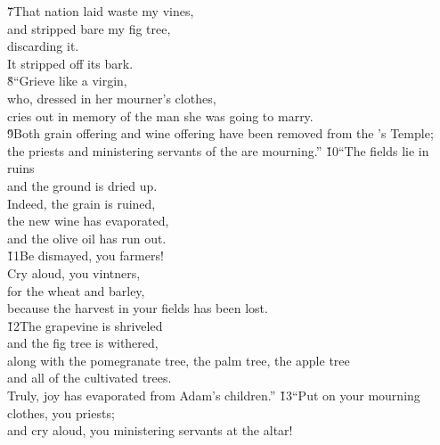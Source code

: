 \begin{poetry}
\poeml \v{7}That nation laid waste my vines, \\
\poemll    and stripped bare my fig tree, \\
\poemlll       discarding it. \\
\poeml It stripped off its bark. \\
\poeml \v{8}``Grieve like a virgin, \\
\poemll    who, dressed in her mourner's clothes, \\
\poemlll       cries out in memory of the man she was going to marry. \\
\poeml \v{9}Both grain offering and wine offering have been removed from the 's Temple; \\
\poemll    the priests and ministering servants of the  are mourning.''
\poeml \v{10}``The fields lie in ruins \\
\poemll    and the ground is dried up. \\
\poeml Indeed, the grain is ruined, \\
\poemll    the new wine has evaporated, \\
\poemlll       and the olive oil has run out. \\
\poeml \v{11}Be dismayed, you farmers! \\
\poemll    Cry aloud, you vintners, \\
\poemlll       for the wheat and barley, \\
\poemll    because the harvest in your fields has been lost. \\
\poeml \v{12}The grapevine is shriveled \\
\poemll    and the fig tree is withered, \\
\poeml along with the pomegranate tree, the palm tree, the apple tree \\
\poemll    and all of the cultivated trees. \\
\poeml Truly, joy has evaporated from Adam's children.''
\poeml \v{13}``Put on your mourning clothes, you priests; \\
\poemll    and cry aloud, you ministering servants at the altar! \\

\end{poetry}
